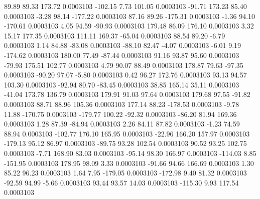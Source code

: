        89.89       89.33      173.72     0.0003103
     -102.15        7.73      101.05     0.0003103
      -91.71      173.23       85.40     0.0003103
       -3.28       98.14     -177.22     0.0003103
       87.16       89.26     -175.31     0.0003103
       -1.36       94.10     -170.61     0.0003103
        4.05       94.59      -90.93     0.0003103
      179.48       86.09      176.10     0.0003103
        3.32       15.17      177.35     0.0003103
      111.11      169.37      -65.04     0.0003103
       88.54       89.20       -6.79     0.0003103
        1.14       84.88      -83.08     0.0003103
      -88.10       82.47       -4.07     0.0003103
       -6.01        9.19     -174.62     0.0003103
      180.00       77.49      -87.44     0.0003103
       91.16       93.87       95.60     0.0003103
      -79.93      175.51      102.77     0.0003103
        4.79       90.07       88.49     0.0003103
      178.87       79.63      -97.35     0.0003103
      -90.20       97.07       -5.80     0.0003103
        0.42       96.27      172.76     0.0003103
       93.13       94.57      103.30     0.0003103
      -92.94       80.70      -83.45     0.0003103
       38.85      165.14       35.11     0.0003103
      -41.04      173.78      136.79     0.0003103
      179.91       91.03       97.64     0.0003103
      179.68       97.55      -91.82     0.0003103
       88.71       88.96      105.36     0.0003103
      177.14       88.23     -178.53     0.0003103
       -9.78       11.88     -170.75     0.0003103
     -179.77      100.22      -92.32     0.0003103
      -86.20       81.94      169.36     0.0003103
        1.28       87.39      -84.94     0.0003103
        2.26       84.11       87.82     0.0003103
       -1.23       74.59       88.94     0.0003103
     -102.77      176.10      165.95     0.0003103
      -22.96      166.20      157.97     0.0003103
     -179.13       95.12       86.97     0.0003103
      -89.75       93.28      102.54     0.0003103
       90.52       93.25      102.75     0.0003103
       -7.71      168.90       83.03     0.0003103
      -95.14       98.30      166.97     0.0003103
     -114.03        8.85     -151.95     0.0003103
      178.95       98.09        3.33     0.0003103
      -91.66       94.66      166.69     0.0003103
        1.30       85.22       96.23     0.0003103
        1.64        7.95     -179.05     0.0003103
     -172.98        9.40       81.32     0.0003103
      -92.59       94.99       -5.66     0.0003103
       93.44       93.57       14.03     0.0003103
     -115.30        9.93      117.54     0.0003103
